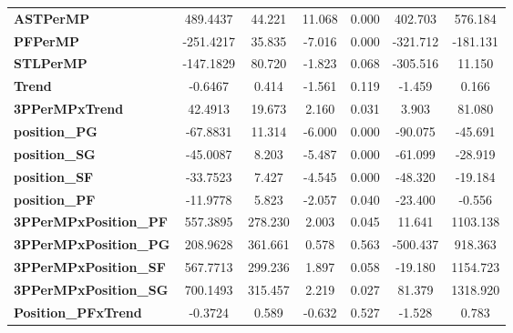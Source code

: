 \begin{center}
\begin{tabular}{lcccccc}
\textbf{ASTPerMP}                   &     489.4437  &       44.221     &    11.068  &         0.000        &      402.703    &      576.184     \\
\textbf{PFPerMP}                    &    -251.4217  &       35.835     &    -7.016  &         0.000        &     -321.712    &     -181.131     \\
\textbf{STLPerMP}                   &    -147.1829  &       80.720     &    -1.823  &         0.068        &     -305.516    &       11.150     \\
\textbf{Trend}                      &      -0.6467  &        0.414     &    -1.561  &         0.119        &       -1.459    &        0.166     \\
\textbf{3PPerMPxTrend}              &      42.4913  &       19.673     &     2.160  &         0.031        &        3.903    &       81.080     \\
\textbf{position\_PG}               &     -67.8831  &       11.314     &    -6.000  &         0.000        &      -90.075    &      -45.691     \\
\textbf{position\_SG}               &     -45.0087  &        8.203     &    -5.487  &         0.000        &      -61.099    &      -28.919     \\
\textbf{position\_SF}               &     -33.7523  &        7.427     &    -4.545  &         0.000        &      -48.320    &      -19.184     \\
\textbf{position\_PF}               &     -11.9778  &        5.823     &    -2.057  &         0.040        &      -23.400    &       -0.556     \\
\textbf{3PPerMPxPosition\_PF}       &     557.3895  &      278.230     &     2.003  &         0.045        &       11.641    &     1103.138     \\
\textbf{3PPerMPxPosition\_PG}       &     208.9628  &      361.661     &     0.578  &         0.563        &     -500.437    &      918.363     \\
\textbf{3PPerMPxPosition\_SF}       &     567.7713  &      299.236     &     1.897  &         0.058        &      -19.180    &     1154.723     \\
\textbf{3PPerMPxPosition\_SG}       &     700.1493  &      315.457     &     2.219  &         0.027        &       81.379    &     1318.920     \\
\textbf{Position\_PFxTrend}         &      -0.3724  &        0.589     &    -0.632  &         0.527        &       -1.528    &        0.783     \\

\end{tabular}
\end{center}
